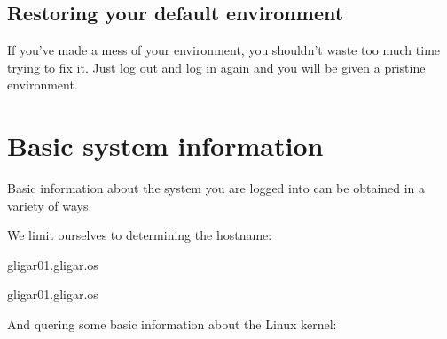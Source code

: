 \subsection{Restoring your default environment}

If you've made a mess of your environment, you shouldn't waste too much time
trying to fix it. Just log out and log in again and you will be given a
pristine environment.

\section{Basic system information}

Basic information about the system you are logged into can be obtained in a variety of ways.

We limit ourselves to determining the hostname:

\begin{prompt}
  gligar01.gligar.os

  gligar01.gligar.os
\end{prompt}

And quering some basic information about the Linux kernel:

